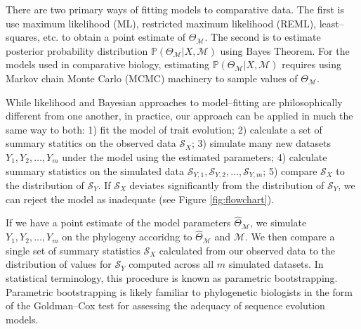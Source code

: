 \documentclass[a4paper,12pt]{article}
\begin{document}
There are two primary ways of fitting models to comparative data. The first is use maximum likelihood (ML), restricted maximum likelihood (REML), least--squares, etc. to obtain a point estimate of $\Theta_{\mathcal{M}}$. The second is to estimate posterior probability distribution $\mathbb{P}(\Theta_{\mathcal{M}}|X, \mathcal{M})$ using Bayes Theorem.
For the models used in comparative biology, estimating $\mathbb{P}(\Theta_{\mathcal{M}}|X, \mathcal{M})$ requires using Markov chain Monte Carlo (MCMC) machinery to sample values of $\Theta_{\mathcal{M}}$.   

While likelihood and Bayesian approaches to model--fitting are philosophically different from one another, in practice, our approach can be applied in much the same way to both: 1) fit the model of trait evolution; 2) calculate a set of summary statitics on the observed data $\mathcal{S}_X$; 3) simulate many new datasets $Y_1, Y_2, \ldots, Y_m$ under the model using the estimated parameters; 4) calculate summary statistics on the simulated data $\mathcal{S}_{Y,1}, \mathcal{S}_{Y,2}, \ldots, \mathcal{S}_{Y,m}$; 5) compare $\mathcal{S}_X$ to the distribution of $\mathcal{S}_Y$. If $\mathcal{S}_X$ deviates significantly from the distribution of $\mathcal{S}_Y$, we can reject the model as inadequate (see Figure \ref{fig:flowchart}).

If we have a point estimate of the model parameters $\hat{\Theta}_{\mathcal{M}}$, we simulate $Y_1, Y_2, \ldots, Y_m$ on the phylogeny accoridng to $\hat{\Theta}_{\mathcal{M}}$ and $\mathcal{M}$. We then compare a single set of summary statistics $\mathcal{S}_X$ calculated from our observed data to the distribution of values for $\mathcal{S}_Y$ computed across all $m$ simulated datasets. In statistical terminology, this procedure is known as parametric bootstrapping. Parametric bootstrapping is likely familiar to phylogenetic biologists in the form of the Goldman--Cox test \citep{Goldman} for assessing the adequacy of sequence evolution models.
\end{document}
